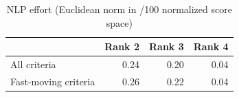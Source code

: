 \begin{table}[htbp]
\centering
\caption{NLP effort (Euclidean norm in /100 normalized score space)}
\label{tab:e1-nlp}
\begin{tabular}{lrrr}
\toprule
 & Rank 2 & Rank 3 & Rank 4 \\
\midrule
All criteria & 0.24 & 0.20 & 0.04 \\
Fast-moving criteria & 0.26 & 0.22 & 0.04 \\
\bottomrule
\end{tabular}
\end{table}
